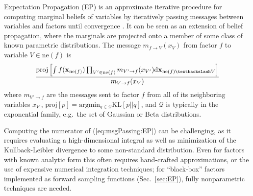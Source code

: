 \documentclass[english]{article}
\theoremstyle{plain}
\theoremstyle{plain}
\newcommand{\bx}{\mathbf{x}}				%
\newcommand{\factor}{f}				%
\newcommand{\outV}{V}                         %
\newcommand{\fis}[1]{\mathrm{ne}(#1)}   	%
\newcommand{\fx}[1]{ \mathbf{x}_{\mathrm{ne}(#1)} }   	%
\newcommand{\xin}{\mathbf{x}_{ \mathrm{in} }} 			%
\newcommand{\xout}{\mathbf{x}_{ \mathrm{out} }}			%
\newcommand{\msg}[2]{m_{#1 \rightarrow #2}}			%
\newcommand{\diffd}{\mathrm{d}}
\newcommand{\projP}[1]{\mathrm{proj} \left [ #1 \right]}
\newcommand{\argmin}[1]{\mathrm{arg}\mathrm{min}_{#1}}
\newcommand{\kld}[2]{\mathrm{KL} \left [ #1 || #2 \right ]}
\begin{document}
Expectation Propagation (EP) is an approximate iterative procedure for computing marginal beliefs of variables
by iteratively passing messages between variables and factors until convergence \citep{Minka2001}.
It can be seen as an extension of belief propagation, where the marginals are projected
onto a member of some class of known parametric distributions. 
The message $\msg{ \factor }{\outV}(x_{\outV})$  from factor $\factor$ to variable $\outV\in\fis{\factor}$ is 
%
\begin{equation}
\small
\frac{ \projP{ 
\int \factor (\fx{\factor}) \prod_{\outV' \in \fis{\factor}} \msg{\outV'}{\factor}(x_{\outV'}) \diffd 
\bx_{\fis{\factor} \textbackslash \outV}} }
{\msg{\outV}{\factor}(x_{\outV})}
%
\label{eq:msgPassing:EP}
\end{equation}
%
where $\msg{\outV'}{\factor}$ are the messages sent to factor $\factor$ from all of its neighboring variables $x_{\outV'}$,
$\projP{p} = \argmin{q \in \mathcal{Q}} \kld{p}{q}$, and $\mathcal{Q}$ is typically in the exponential family, e.g.\ the set of Gaussian or Beta distributions.



Computing the numerator of (\ref{eq:msgPassing:EP}) can be challenging, as it requires evaluating a high-dimensional integral as well as minimization of the Kullback-Leibler divergence to some non-standard distribution. Even for factors with known analytic form this often requires hand-crafted approximations, or the use of expensive numerical integration techniques; for ``black-box'' factors implemented as forward sampling functions (Sec.\ \ref{sec:EP}), fully nonparametric techniques are needed. 

\end{document}
